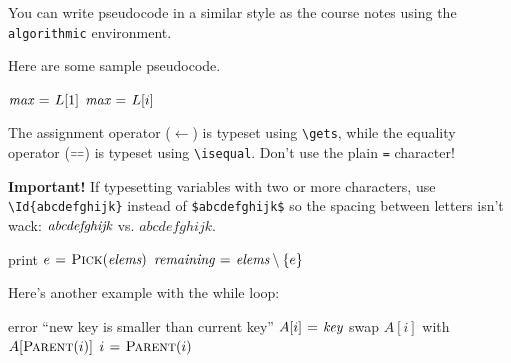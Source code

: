 \documentclass[12pt]{article}
\begin{document}
You can write pseudocode in a similar style as the course notes using the \verb|algorithmic| environment.

Here are some sample pseudocode.
\begin{algorithmic}[1]
    \State $\textit{max} \mathrel{\hspace{1pt}=\hspace{1pt}} L[1]$
            \State $\textit{max} \mathrel{\hspace{1pt}=\hspace{1pt}} L[i]$
        \EndIf
    \EndFor
    \Return {}
\end{algorithmic}

The assignment operator ($\gets$) is typeset using \verb|\gets|, while the equality operator ($\isequal$) is typeset using \verb|\isequal|. Don't use the plain \verb|=| character!

\textbf{Important!} If typesetting variables with two or more characters, use \verb|\Id{abcdefghijk}| instead of \verb|$abcdefghijk$| so the spacing between letters isn't wack: $\textit{abcdefghijk}$ vs. $abcdefghijk$.
\begin{algorithmic}[1]
        \State print 
    \Else
        \State $e \gets \Call{Pick}{\Id{elems}}$
        \State $\textit{remaining} \mathrel{\hspace{1pt}=\hspace{1pt}} \textit{elems} \setminus \left\{e\right\}$
        \State {}
        \State {}
    \EndIf
\end{algorithmic}

Here's another example with the while loop:
\begin{algorithmic}[1]
        \State error ``new key is smaller than current key''
    \EndIf
    \State $A[i] \mathrel{\hspace{1pt}=\hspace{1pt}} \textit{key}$
        \State swap $A[i]$ with $A[\Call{Parent}{i}]$
        \State $i \gets \Call{Parent}{i}$
    \EndWhile
\end{algorithmic}
\end{document}
